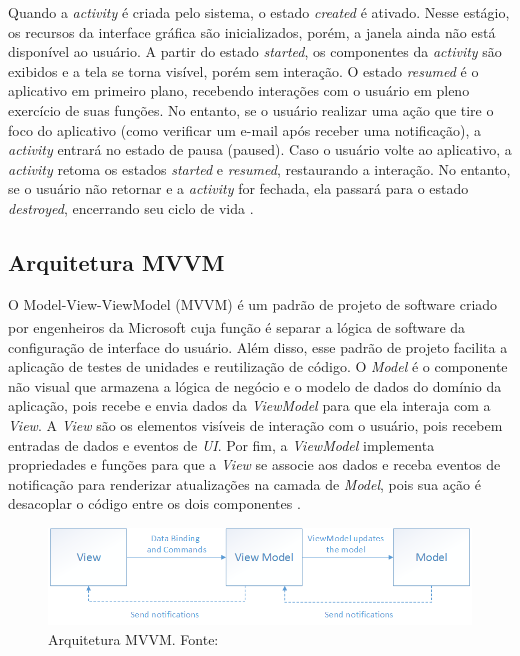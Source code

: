 Quando a \textit{activity} é criada pelo sistema, o estado \textit{created} é ativado. Nesse estágio, os recursos da interface gráfica 
são inicializados, porém, a janela ainda não está disponível ao usuário. A partir do estado \textit{started}, os componentes da \textit{activity} são exibidos e a tela se torna visível, porém sem interação.
O estado \textit{resumed} é o aplicativo em primeiro plano, recebendo interações com o usuário em pleno exercício de suas funções. No entanto, se o usuário realizar uma ação que tire 
o foco do aplicativo (como verificar um e-mail após receber uma notificação), a \textit{activity} entrará no estado de pausa (paused).
Caso o usuário volte ao aplicativo, a \textit{activity} retoma os estados \textit{started} e \textit{resumed}, restaurando a interação. No entanto, se o usuário não retornar e a \textit{activity} for fechada, 
ela passará para o estado \textit{destroyed}, encerrando seu ciclo de vida \cite{google-developers-activity-lifecycle}.

\subsection{Arquitetura MVVM}

O Model-View-ViewModel (MVVM) é um padrão de projeto de software criado por engenheiros da Microsoft\textsuperscript{\textregistered} 
cuja função é separar a lógica de software da configuração de interface do usuário. Além disso, esse padrão de projeto facilita a aplicação de testes de unidades e reutilização 
de código. O \textit{Model} é o componente não visual que armazena a lógica de negócio e o modelo de dados do domínio da aplicação, pois recebe e envia dados da \textit{ViewModel} 
para que ela interaja com a \textit{View}. A \textit{View} são os elementos visíveis de interação com o usuário, pois recebem entradas de dados e eventos de \textit{UI}. Por fim, a
\textit{ViewModel} implementa propriedades e funções para que a \textit{View} se associe aos dados e receba eventos de notificação para renderizar atualizações na camada de \textit{Model}, pois
sua ação é desacoplar o código entre os dois componentes \cite{mvvm-documentation}.

\begin{figure}[ht]
    \centering
    \includegraphics[width=.87\textwidth]{img/mvvm-pattern.png}
    \caption{Arquitetura MVVM. Fonte:\cite{mvvm-documentation}}\label{figMVVM}
\end{figure}


